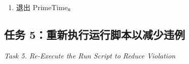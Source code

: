 \begin{enumerate}
\begin{questionBox}
\textbf{问题 25.}\ 如何修改  以添加检查，验证所有时钟均为 propagated？\\[0.35em]
\textbf{答：} 附加检查名为 \textbf{ideal\_clocks}。
可用  将其加入变量 ，
使  自动执行该检查（下一任务中将在
 中完成）：
\begin{lstlisting}
lappend timing_check_defaults ideal_clocks
set timing_all_clocks_propagated true
\end{lstlisting}

\textbf{任务 5 步骤 4 验证要点：}
\begin{itemize}
  \item {} 违例应已减少；
  \item {} 显示所有时钟均为 propagated；
  \item {} 执行默认检查及 \texttt{ideal\_clocks} 检查；
  \item {} 显示 source latency 已计算；
  \item 到  的时序报告包含 \texttt{clock network delay (propagated)}，
        slack 由违例变为 \textbf{MET}（1.5143\,ns）。
\end{itemize}
\end{questionBox}

  \item 退出 PrimeTime。
\end{enumerate}

\subsection{任务 5：重新执行运行脚本以减少违例}
\label{lab4:task5}

\noindent\textit{Task 5. Re-Execute the Run Script to Reduce Violation}

